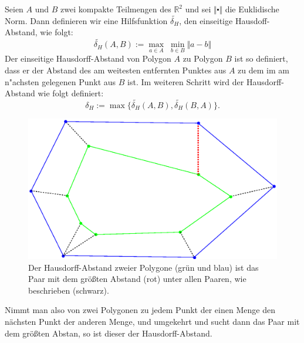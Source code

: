 Seien $A$ und $B$ zwei kompakte Teilmengen des $\mathbb{R}^2$ und sei $\Vert\centerdot\Vert$ die Euklidische Norm.
Dann definieren wir eine Hilfsfunktion $ \widetilde{\delta_H}  $, den einseitige Hausdoff-Abstand, wie folgt:
\[ \widetilde{\delta_H}(A,B):=\max_{a\in A} \;\min_{b\in B} \Vert a-b \Vert\]
Der einseitige Hausdorff-Abstand von Polygon $A$ zu Polygon $B$ ist so definiert, dass er der Abstand des am weitesten entfernten Punktes aus $A$ zu dem im am n"achsten gelegenen Punkt aus $B$ ist.  Im weiteren Schritt wird der Hausdorff-Abstand wie folgt definiert: 
\[\delta_H:=\max\{\widetilde{\delta_H}(A,B),\widetilde{\delta_H}(B,A)\}.\]
\begin{figure}
	\centering
	\includegraphics[scale=.6]{Hausdorff.eps}
	\caption[Der Hausdorff-Abstand zweier Polygone]{Der Hausdorff-Abstand zweier Polygone (grün und blau) ist das Paar mit dem größten Abstand (rot) unter allen Paaren, wie beschrieben (schwarz).}
	\label{fig:HausdorffAbstand}
\end{figure}
Nimmt man also von zwei Polygonen zu jedem Punkt der einen Menge den nächsten Punkt der anderen Menge, und umgekehrt und sucht dann das Paar mit dem größten Abstan, so ist dieser der Hausdorff-Abstand.



